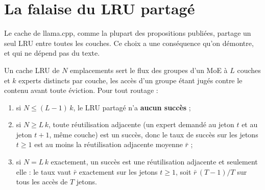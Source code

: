 \section{La falaise du LRU partagé}\label{sec:t2o-falaise}

Le cache de llama.cpp, comme la plupart des propositions publiées, partage un seul LRU entre toutes les couches. Ce choix a une conséquence qu'on démontre, et qui ne dépend pas du texte.

\begin{proposition}\label{prop:t2o-falaise}
Un cache LRU de $N$ emplacements sert le flux des groupes d'un MoE à $L$ couches et $k$ experts distincts par couche, les accès d'un groupe étant jugés contre le contenu avant toute éviction. Pour tout routage :
\begin{enumerate}
\item si $N \le (L-1)\,k$, le LRU partagé n'a \textbf{aucun succès} ;
\item si $N \ge L\,k$, toute réutilisation adjacente (un expert demandé au jeton $t$ et au jeton $t+1$, même couche) est un succès, donc le taux de succès sur les jetons $t \ge 1$ est au moins la réutilisation adjacente moyenne $\bar r$ ;
\item si $N = L\,k$ exactement, un succès est une réutilisation adjacente et seulement elle : le taux vaut $\bar r$ exactement sur les jetons $t \ge 1$, soit $\bar r\,(T-1)/T$ sur tous les accès de $T$ jetons.
\end{enumerate}
\end{proposition}

